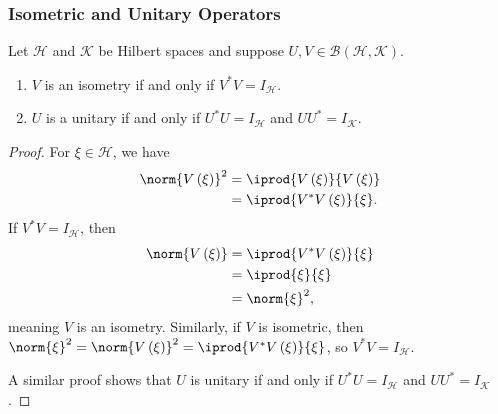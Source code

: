 \documentclass[10pt]{mypackage}
\begin{document}
\subsubsection{Isometric and Unitary Operators}%
\begin{lemma}
  Let $\mathcal{H}$ and $\mathcal{K}$ be Hilbert spaces and suppose $U,V\in \mathcal{B}\left(\mathcal{H},\mathcal{K}\right)$.
  \begin{enumerate}[(1)]
    \item $V$ is an isometry if and only if $V^{\ast}V = I_{\mathcal{H}}$.
    \item $U$ is a unitary if and only if $U^{\ast}U = I_{\mathcal{H}}$ and $UU^{\ast} = I_{\mathcal{K}}$.
  \end{enumerate}
\end{lemma}
\begin{proof}
  For $\xi\in \mathcal{H}$, we have
  \begin{align*}
    \norm{V\left(\xi\right)}^2 &= \iprod{V\left(\xi\right)}{V\left(\xi\right)}\\
                               &= \iprod{V^{\ast}V\left(\xi\right)}{\xi}.
  \end{align*}
  If $V^{\ast}V = I_{\mathcal{H}}$, then 
  \begin{align*}
    \norm{V\left(\xi\right)} &= \iprod{V^{\ast}V\left(\xi\right)}{\xi}\\
                             &= \iprod{\xi}{\xi}\\
                             &= \norm{\xi}^2,
  \end{align*}
  meaning $V$ is an isometry. Similarly, if $V$ is isometric, then $\norm{\xi}^2 = \norm{V\left(\xi\right)}^2 = \iprod{V^{\ast}V\left(\xi\right)}{\xi}$, so $V^{\ast}V = I_{\mathcal{H}}$.\newline

  A similar proof shows that $U$ is unitary if and only if $U^{\ast}U = I_{\mathcal{H}}$ and $UU^{\ast} = I_{\mathcal{K}}$.
\end{proof}
\end{document}
